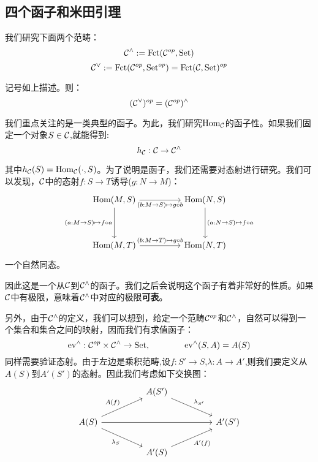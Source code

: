 \subsection{四个函子和米田引理}
我们研究下面两个范畴：
$$
\mathcal{C}^{\wedge}:=\text{Fct}(\mathcal{C}^{op},\text{Set})
$$
$$
\mathcal{C}^{\vee }:=\text{Fct}(\mathcal{C}^{op},\text{Set}^{op})=\text{Fct}(\mathcal{C},\text{Set})^{op}
$$
\begin{proposition}{}
    记号如上描述。则：
    $$
    (\mathcal{C}^{\vee})^{op}=(\mathcal{C}^{op})^{\wedge}
    $$
\end{proposition}

我们重点关注的是一类典型的函子。为此，我们研究$\text{Hom}_{\mathcal{C}}$的函子性。如果我们固定一个对象$S \in \mathcal{C}$,就能得到:
$$
h_{\mathcal{C}}:\mathcal{C} \to \mathcal{C}^{\wedge}
$$
    
其中$h_{\mathcal{C}}(S)=\text{Hom}_{\mathcal{C}}(\cdot,S)$。为了说明是函子，我们还需要对态射进行研究。我们可以发现，$\mathcal{C}$中的态射$f:S \to T$诱导($g:N \to M$)：
\[
    \centering
    \begin{tikzcd}
        {\text{Hom}(M,S)} && {\text{Hom}(N,S)} \\
        \\
        {\text{Hom}(M,T)} && {\text{Hom}(N,T)}
        \arrow["{(a:M \to S) \mapsto f\circ a}"', from=1-1, to=3-1]
        \arrow["{(b:M \to S) \mapsto g\circ b}"', from=1-1, to=1-3]
        \arrow["{(a:N \to S) \mapsto f\circ a}", from=1-3, to=3-3]
        \arrow["{(b:M \to T) \mapsto g\circ b}", from=3-1, to=3-3]
    \end{tikzcd}
    \]
    一个自然同态。

    因此这是一个从$\mathcal{C}$到$\mathcal{C}^{\wedge}$的函子。我们之后会说明这个函子有着非常好的性质。如果$\mathcal{C}$中有极限，意味着$\mathcal{C}^{\wedge}$中对应的极限\textbf{可表}。

    另外，由于$\mathcal{C}^{\wedge}$的定义，我们可以想到，给定一个范畴$\mathcal{C}^{op}$和$\mathcal{C}^{\wedge}$，自然可以得到一个集合和集合之间的映射，因而我们有求值函子：
    $$
    \text{ev}^{\wedge}:\mathcal{C}^{op}\times \mathcal{C}^{\wedge} \to \text{Set}, \quad \quad \qquad \text{ev}^{\wedge}(S,A)=A(S)
    $$
    同样需要验证态射。由于左边是乘积范畴,设$f:S' \to S$,$\lambda:A \to A'$,则我们要定义从$A(S)$到$A'(S')$的态射。因此我们考虑如下交换图：
    \[
        \centering
        \begin{tikzcd}
            && {A(S')} \\
            {A(S)} &&&& {A'(S')} \\
            && {A'(S)}
            \arrow["{A(f)}", from=2-1, to=1-3]
            \arrow["{\lambda_{S'}}", from=1-3, to=2-5]
            \arrow["{\lambda_{S}}"', from=2-1, to=3-3]
            \arrow["{A'(f)}"', from=3-3, to=2-5]
            \arrow[from=2-1, to=2-5]
        \end{tikzcd}
    \]

